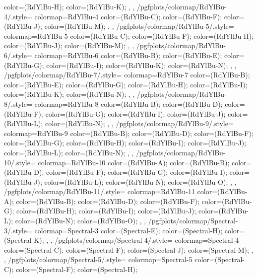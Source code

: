 {{{      color=(RdYlBu-H);
      color=(RdYlBu-K);
    },
  },
  /pgfplots/colormap/RdYlBu-4/.style={
    colormap={RdYlBu-4}{
      color=(RdYlBu-C);
      color=(RdYlBu-F);
      color=(RdYlBu-J);
      color=(RdYlBu-M);
    },
  },
  /pgfplots/colormap/RdYlBu-5/.style={
    colormap={RdYlBu-5}{
      color=(RdYlBu-C);
      color=(RdYlBu-F);
      color=(RdYlBu-H);
      color=(RdYlBu-J);
      color=(RdYlBu-M);
    },
  },
  /pgfplots/colormap/RdYlBu-6/.style={
    colormap={RdYlBu-6}{
      color=(RdYlBu-B);
      color=(RdYlBu-E);
      color=(RdYlBu-G);
      color=(RdYlBu-I);
      color=(RdYlBu-K);
      color=(RdYlBu-N);
    },
  },
  /pgfplots/colormap/RdYlBu-7/.style={
    colormap={RdYlBu-7}{
      color=(RdYlBu-B);
      color=(RdYlBu-E);
      color=(RdYlBu-G);
      color=(RdYlBu-H);
      color=(RdYlBu-I);
      color=(RdYlBu-K);
      color=(RdYlBu-N);
    },
  },
  /pgfplots/colormap/RdYlBu-8/.style={
    colormap={RdYlBu-8}{
      color=(RdYlBu-B);
      color=(RdYlBu-D);
      color=(RdYlBu-F);
      color=(RdYlBu-G);
      color=(RdYlBu-I);
      color=(RdYlBu-J);
      color=(RdYlBu-L);
      color=(RdYlBu-N);
    },
  },
  /pgfplots/colormap/RdYlBu-9/.style={
    colormap={RdYlBu-9}{
      color=(RdYlBu-B);
      color=(RdYlBu-D);
      color=(RdYlBu-F);
      color=(RdYlBu-G);
      color=(RdYlBu-H);
      color=(RdYlBu-I);
      color=(RdYlBu-J);
      color=(RdYlBu-L);
      color=(RdYlBu-N);
    },
  },
  /pgfplots/colormap/RdYlBu-10/.style={
    colormap={RdYlBu-10}{
      color=(RdYlBu-A);
      color=(RdYlBu-B);
      color=(RdYlBu-D);
      color=(RdYlBu-F);
      color=(RdYlBu-G);
      color=(RdYlBu-I);
      color=(RdYlBu-J);
      color=(RdYlBu-L);
      color=(RdYlBu-N);
      color=(RdYlBu-O);
    },
  },
  /pgfplots/colormap/RdYlBu-11/.style={
    colormap={RdYlBu-11}{
      color=(RdYlBu-A);
      color=(RdYlBu-B);
      color=(RdYlBu-D);
      color=(RdYlBu-F);
      color=(RdYlBu-G);
      color=(RdYlBu-H);
      color=(RdYlBu-I);
      color=(RdYlBu-J);
      color=(RdYlBu-L);
      color=(RdYlBu-N);
      color=(RdYlBu-O);
    },
  },
  /pgfplots/colormap/Spectral-3/.style={
    colormap={Spectral-3}{
      color=(Spectral-E);
      color=(Spectral-H);
      color=(Spectral-K);
    },
  },
  /pgfplots/colormap/Spectral-4/.style={
    colormap={Spectral-4}{
      color=(Spectral-C);
      color=(Spectral-F);
      color=(Spectral-J);
      color=(Spectral-M);
    },
  },
  /pgfplots/colormap/Spectral-5/.style={
    colormap={Spectral-5}{
      color=(Spectral-C);
      color=(Spectral-F);
      color=(Spectral-H);
}}}
